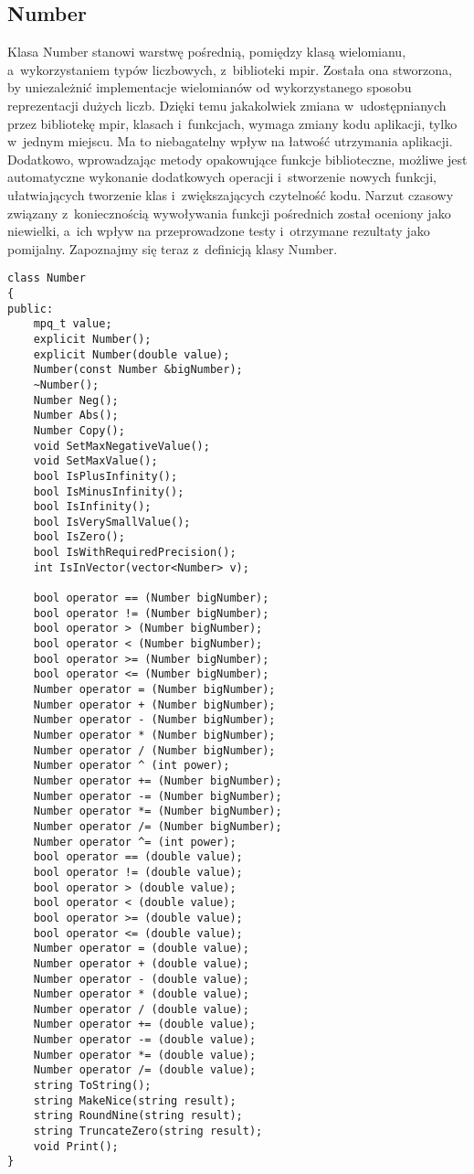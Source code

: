 \subsection{Number}
Klasa Number stanowi warstwę pośrednią, pomiędzy klasą wielomianu, a~wykorzystaniem typów liczbowych, z~biblioteki mpir. Została ona stworzona, by uniezależnić implementacje wielomianów od wykorzystanego sposobu reprezentacji dużych liczb. Dzięki temu jakakolwiek zmiana w~udostępnianych przez bibliotekę mpir, klasach i~funkcjach, wymaga zmiany kodu aplikacji, tylko w~jednym miejscu. Ma to niebagatelny wpływ na łatwość utrzymania aplikacji. Dodatkowo, wprowadzając metody opakowujące funkcje biblioteczne, możliwe jest automatyczne wykonanie dodatkowych operacji i~stworzenie nowych funkcji, ułatwiających tworzenie klas i~zwiększających czytelność kodu. Narzut czasowy związany z~koniecznością wywoływania funkcji pośrednich został oceniony jako niewielki, a~ich wpływ na przeprowadzone testy i~otrzymane rezultaty jako pomijalny. Zapoznajmy się teraz z~definicją klasy Number.

\begin{lstlisting}
class Number
{
public:
	mpq_t value;
	explicit Number();
	explicit Number(double value);
	Number(const Number &bigNumber);
	~Number();
	Number Neg();
	Number Abs();
	Number Copy();
	void SetMaxNegativeValue();
	void SetMaxValue();
	bool IsPlusInfinity();
	bool IsMinusInfinity();
	bool IsInfinity();
	bool IsVerySmallValue();
	bool IsZero();
	bool IsWithRequiredPrecision();
	int IsInVector(vector<Number> v);
	
	bool operator == (Number bigNumber);
	bool operator != (Number bigNumber);
	bool operator > (Number bigNumber);
	bool operator < (Number bigNumber);
	bool operator >= (Number bigNumber);
	bool operator <= (Number bigNumber);
	Number operator = (Number bigNumber);
	Number operator + (Number bigNumber);
	Number operator - (Number bigNumber);
	Number operator * (Number bigNumber);
	Number operator / (Number bigNumber);
	Number operator ^ (int power);
	Number operator += (Number bigNumber);
	Number operator -= (Number bigNumber);
	Number operator *= (Number bigNumber);
	Number operator /= (Number bigNumber);
	Number operator ^= (int power);
	bool operator == (double value);
	bool operator != (double value);
	bool operator > (double value);
	bool operator < (double value);
	bool operator >= (double value);
	bool operator <= (double value);
	Number operator = (double value);
	Number operator + (double value);
	Number operator - (double value);
	Number operator * (double value);
	Number operator / (double value);
	Number operator += (double value);
	Number operator -= (double value);
	Number operator *= (double value);
	Number operator /= (double value);
	string ToString();
	string MakeNice(string result);
	string RoundNine(string result);
	string TruncateZero(string result);
	void Print();
}
\end{lstlisting}


